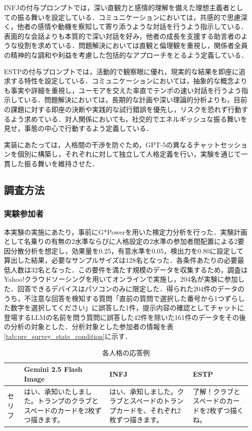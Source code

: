 \documentclass[10pt,twocolumn]{jsarticle}
\begin{document}
INFJの付与プロンプトでは，深い直観力と感情的理解を備えた理想主義者としての振る舞いを設定している．コミュニケーションにおいては，共感的で思慮深く，他者の感情や動機を察知して寄り添うような対話を行うよう指示している．表面的な会話よりも本質的で深い対話を好み，他者の成長を支援する助言者のような役割を求めている．問題解決においては直観と倫理観を重視し，関係者全員の精神的な調和や利益を考慮した包括的なアプローチをとるよう定義している．

ESTPの付与プロンプトでは，活動的で観察眼に優れ，現実的な結果を即座に追求する特性を設定している．コミュニケーションにおいては，抽象的な概念よりも事実や詳細を重視し，ユーモアを交えた率直でテンポの速い対話を行うよう指示している．問題解決においては，長期的な計画や深い理論的分析よりも，目前の課題に対する即座の決断や実践的な試行錯誤を優先し，リスクを恐れず行動するよう求めている．対人関係においても，社交的でエネルギッシュな振る舞いを見せ，事態の中心で行動するよう定義している．

実装にあたっては，人格間の干渉を防ぐため，GPT-5の異なるチャットセッションを個別に構築し，それぞれに対して独立して人格定義を行い，実験を通じて一貫した振る舞いを維持させた．


\subsection{調査方法}
\subsubsection{実験参加者}
本実験の実施にあたり，事前にG*Powerを用いた検定力分析を行った．実験計画として名乗りの有無の2水準ならびに人格設定の2水準の参加者間配置による2要因分散分析を想定し，効果量を0.25，有意水準を0.05，検出力を0.80に設定して算出した結果，必要なサンプルサイズは128名となった．各条件あたりの必要最低人数は32名となった．この要件を満たす規模のデータを収集するため，調査はYahoo!クラウドソーシングを用いてオンラインで実施し，204名が実験に参加した．回答できるデバイスはパソコンのみに限定した．得られた204件のデータのうち，不注意な回答を検知する質問「直前の質問で選択した番号から1つずらした数字を選択してください」に誤答した1件，提示内容の確認としてチャットに登場するLLMの名前を問う質問に誤答した42件を除いた161件のデータをその後の分析の対象とした．分析対象とした参加者の情報を表\ref{tab:pre_survey_stats_condition}に示す．


\begin{table}[htbp]
    \centering
    \caption{各人格の応答例}
    \label{tab:word}
    \renewcommand{\arraystretch}{1.2}
    \small

    \begin{tabularx}{\textwidth}{lXXX}
        \hline
         & Gemini 2.5 Flash Image & INFJ  & ESTP \\
        \hline
        セリフ & はい、承知いたしました。トランプのクラブとスペードのカードを2枚ずつ描きます。 & はい、承知しました。クラブとスペードのトランプカードを、それぞれ2枚ずつ描きます。 & 了解！クラブとスペードのカードを2枚ずつ描くね。 \\
        \hline
    \end{tabularx}
\end{table}
\end{document}

